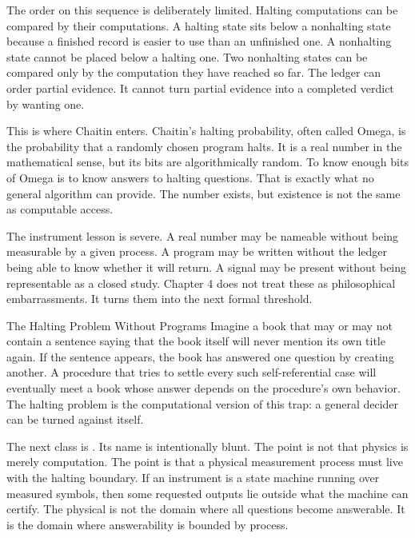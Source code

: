 The order on this sequence is deliberately limited. Halting computations can
be compared by their computations. A halting state sits below a nonhalting
state because a finished record is easier to use than an unfinished one. A
nonhalting state cannot be placed below a halting one. Two nonhalting states
can be compared only by the computation they have reached so far. The ledger
can order partial evidence. It cannot turn partial evidence into a completed
verdict by wanting one.

This is where Chaitin enters. Chaitin's halting probability, often called
Omega, is the probability that a randomly chosen program halts. It is a real
number in the mathematical sense, but its bits are algorithmically random. To
know enough bits of Omega is to know answers to halting questions. That is
exactly what no general algorithm can provide. The number exists, but existence
is not the same as computable access.

The instrument lesson is severe. A real number may be nameable without being
measurable by a given process. A program may be written without the ledger
being able to know whether it will return. A signal may be present without
being representable as a closed study. Chapter 4 does not treat these as
philosophical embarrassments. It turns them into the next formal threshold.

\begin{sidebar}{The Halting Problem Without Programs}
\label{sb:halting-without-programs}
Imagine a book that may or may not contain a sentence saying that the book
itself will never mention its own title again. If the sentence appears, the
book has answered one question by creating another. A procedure that tries to
settle every such self-referential case will eventually meet a book whose
answer depends on the procedure's own behavior. The halting problem is the
computational version of this trap: a general decider can be turned against
itself.
\end{sidebar}

The next class is . Its name is intentionally blunt. The point
is not that physics is merely computation. The point is that a physical
measurement process must live with the halting boundary. If an instrument is a
state machine running over measured symbols, then some requested outputs lie
outside what the machine can certify. The physical is not the domain where all
questions become answerable. It is the domain where answerability is bounded
by process.


